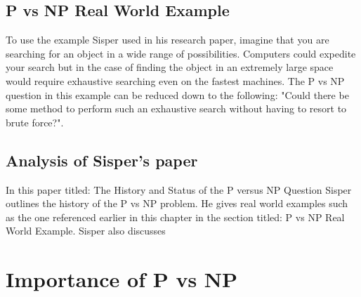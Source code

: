 \documentclass{report}
\begin{document}
\section{P vs NP Real World Example}
To use the example Sisper used in his research paper\cite{HistoryOfPVsNP}, imagine that you are searching for an object in a wide range of possibilities.  Computers could expedite your search but in the case of finding the object in an extremely large space would require exhaustive searching even on the fastest machines.  The P vs NP question in this example can be reduced down to the following: "Could there be some method to perform such an exhaustive search without having to resort to brute force?".
\section{Analysis of Sisper's paper}
In this paper titled: The History and Status of the P versus NP Question Sisper outlines the history of the P vs NP problem.  He gives real world examples such as the one referenced earlier in this chapter in the section titled: P vs NP Real World Example.  Sisper also discusses
\chapter{Importance of P vs NP}



\end{document}
